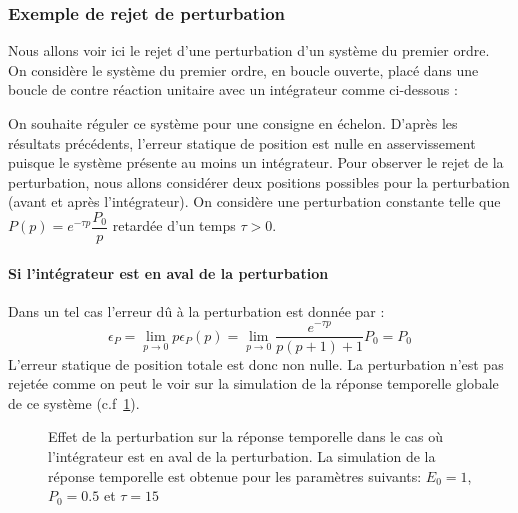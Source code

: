 \subsubsection{Exemple de rejet de perturbation}
Nous allons voir ici le rejet d'une perturbation d'un système du premier ordre. 
On considère le système du premier ordre, en boucle ouverte, placé dans une 
boucle de contre réaction unitaire avec un intégrateur comme ci-dessous :
\begin{center}                           
    
\end{center}                             
On souhaite réguler ce système pour une consigne en échelon.
D'après les résultats précédents, l'erreur statique de position est nulle 
en asservissement puisque le système présente au moins un intégrateur. 
Pour observer le rejet de la perturbation, nous allons considérer 
deux positions possibles pour la perturbation (avant et après 
l'intégrateur). On considère une perturbation constante telle 
que $P(p)=e^{-\tau p}\dfrac{P_0}{p}$ retardée d'un temps $\tau>0$. 
\paragraph{Si l'intégrateur est en aval de la perturbation}
Dans un tel cas l'erreur dû à la perturbation est donnée par :
\[
\epsilon_P=\lim\limits_{p\to0}p\epsilon_P(p)=
\lim\limits_{p\to0}\dfrac{e^{-\tau p}}{p(p+1)+1}P_0=P_0
\]
L'erreur statique de position totale est donc non nulle. La perturbation
n'est pas rejetée comme on peut le voir sur la simulation de la réponse
temporelle globale de ce système (c.f~\cref{fig-pert1}).
\begin{figure}[!h]
    \centering
    
    \caption{Effet de la perturbation sur la réponse temporelle dans le cas
             où l'intégrateur est en aval de la perturbation. La simulation 
             de la réponse temporelle est obtenue pour les paramètres suivants:
             $E_0=1$, $P_0=0.5$ et $\tau=15$\label{fig-pert1}}
\end{figure}
